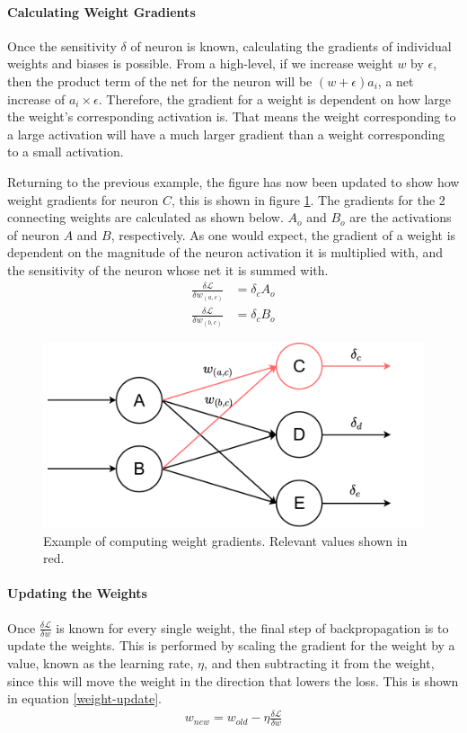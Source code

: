 \paragraph{Calculating Weight Gradients}
Once the sensitivity $\delta$ of neuron is known, calculating the gradients of individual weights and biases is possible. From a high-level, if we increase weight $w$ by $\epsilon$, then the product term of the net for the neuron will be $(w + \epsilon)a_i$, a net increase of $a_i\times\epsilon$. Therefore, the gradient for a weight is dependent on how large the weight's corresponding activation is. That means the weight corresponding to a large activation will have a much larger gradient than a weight corresponding to a small activation.

Returning to the previous example, the figure has now been updated to show how weight gradients for neuron $C$, this is shown in figure \ref{weight-bp}. The gradients for the 2 connecting weights are calculated as shown below. $A_o$ and $B_o$ are the activations of neuron $A$ and $B$, respectively. As one would expect, the gradient of a weight is dependent on the magnitude of the neuron activation it is multiplied with, and the sensitivity of the neuron whose net it is summed with.
\begin{align*}
\frac{\delta \mathcal{L}}{\delta w_{(a,c)}} &= \delta_cA_o\\
\frac{\delta \mathcal{L}}{\delta w_{(b,c)}} &= \delta_cB_o
\end{align*}
\begin{figure}
	\centering 
	\includegraphics[width=\textwidth]{figures/weight_bp.pdf}
	\caption{Example of computing weight gradients. Relevant values shown in red.} \label{weight-bp}
\end{figure}

\paragraph{Updating the Weights}
Once $\frac{\delta \mathcal{L}}{\delta w}$ is known for every single weight, the final step of backpropagation is to update the weights. This is performed by scaling the gradient for the weight by a value, known as the learning rate, $\eta$, and then subtracting it from the weight, since this will move the weight in the direction that lowers the loss. This is shown in equation \ref{weight-update}.
\begin{align}
	w_{new} = w_{old} - \eta\frac{\delta \mathcal{L}}{\delta w} \label{weight-update}
\end{align}



